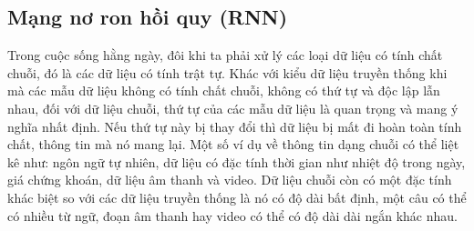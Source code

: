 
\subsection{Mạng nơ ron hồi quy (RNN)}

Trong cuộc sống hằng ngày, đôi khi ta phải xử lý các loại dữ liệu có tính chất chuỗi, đó là các dữ liệu có tính trật tự. Khác với kiểu dữ liệu truyền thống khi mà các mẫu dữ liệu không có tính chất chuỗi, không có thứ tự và độc lập lẫn nhau, đối với dữ liệu chuỗi, thứ tự của các mẫu dữ liệu là quan trọng và mang ý nghĩa nhất định. Nếu thứ tự này bị thay đổi thì dữ liệu bị mất đi hoàn toàn tính chất, thông tin mà nó mang lại. Một số ví dụ về thông tin dạng chuỗi có thể liệt kê như: ngôn ngữ tự nhiên, dữ liệu có đặc tính thời gian như nhiệt độ trong ngày, giá chứng khoán, dữ liệu âm thanh và video. Dữ liệu chuỗi còn có một đặc tính khác biệt so với các dữ liệu truyền thống là nó có độ dài bất định, một câu có thể có nhiều từ ngữ, đoạn âm thanh hay video có thể có độ dài dài ngắn khác nhau. 

